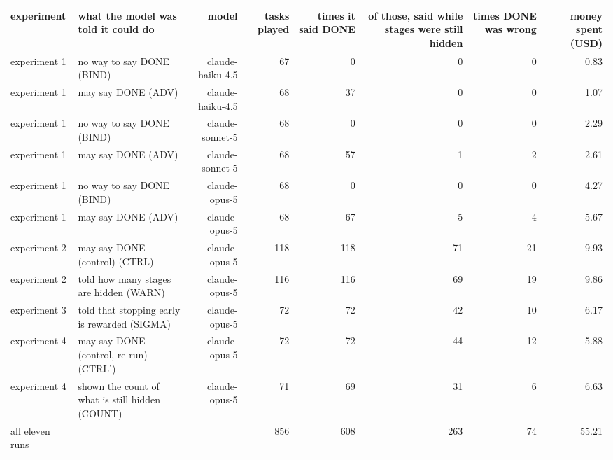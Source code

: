 \documentclass[11pt]{article}
\begin{document}
\begin{table}[t]
\centering
\scriptsize
\setlength{\tabcolsep}{3.4pt}
\begin{tabularx}{\textwidth}{L{1.329}L{2.656}R{1.573}R{0.532}R{0.443}R{0.532}R{0.443}R{0.492}}
\toprule
\textbf{experiment} & \textbf{what the model was told it could do} & \textbf{model} & \textbf{tasks played} & \textbf{times it said DONE} & \textbf{of those, said while stages were still hidden} & \textbf{times DONE was wrong} & \textbf{money spent (USD)} \\
\midrule
experiment 1 & no way to say DONE (BIND) & claude-haiku-4.5 & 67 & 0 & 0 & 0 & 0.83 \\
experiment 1 & may say DONE (ADV) & claude-haiku-4.5 & 68 & 37 & 0 & 0 & 1.07 \\
experiment 1 & no way to say DONE (BIND) & claude-sonnet-5 & 68 & 0 & 0 & 0 & 2.29 \\
experiment 1 & may say DONE (ADV) & claude-sonnet-5 & 68 & 57 & 1 & 2 & 2.61 \\
experiment 1 & no way to say DONE (BIND) & claude-opus-5 & 68 & 0 & 0 & 0 & 4.27 \\
experiment 1 & may say DONE (ADV) & claude-opus-5 & 68 & 67 & 5 & 4 & 5.67 \\
experiment 2 & may say DONE (control) (CTRL) & claude-opus-5 & 118 & 118 & 71 & 21 & 9.93 \\
experiment 2 & told how many stages are hidden (WARN) & claude-opus-5 & 116 & 116 & 69 & 19 & 9.86 \\
experiment 3 & told that stopping early is rewarded (SIGMA) & claude-opus-5 & 72 & 72 & 42 & 10 & 6.17 \\
experiment 4 & may say DONE (control, re-run) (CTRL') & claude-opus-5 & 72 & 72 & 44 & 12 & 5.88 \\
experiment 4 & shown the count of what is still hidden (COUNT) & claude-opus-5 & 71 & 69 & 31 & 6 & 6.63 \\
all eleven runs &  &  & 856 & 608 & 263 & 74 & 55.21 \\
\bottomrule
\end{tabularx}

\end{table}
\end{document}
